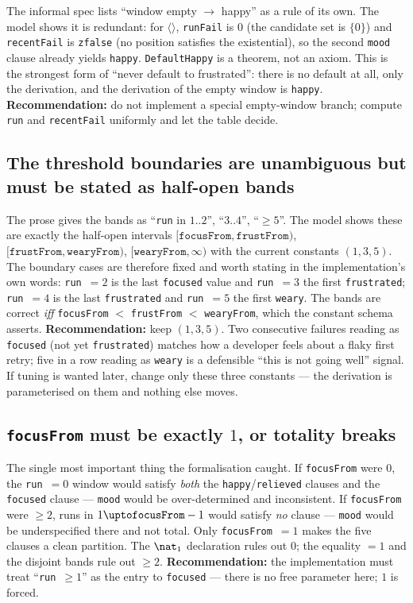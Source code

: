 \documentclass[a4paper,10pt,fleqn]{article}
\begin{document}
The informal spec lists ``window empty $\to$ happy'' as a rule of its own. The
model shows it is redundant: for $\langle\rangle$, \texttt{runFail} is $0$ (the
candidate set is $\{0\}$) and \texttt{recentFail} is \texttt{zfalse} (no position
satisfies the existential), so the second \texttt{mood} clause already yields
\texttt{happy}. \texttt{DefaultHappy} is a theorem, not an axiom. This is the
strongest form of ``never default to frustrated'': there is no default at all,
only the derivation, and the derivation of the empty window is \texttt{happy}.
\textbf{Recommendation:} do not implement a special empty-window branch; compute
\texttt{run} and \texttt{recentFail} uniformly and let the table decide.

\subsection{The threshold boundaries are unambiguous but must be stated as
half-open bands}
\label{find:bands}

The prose gives the bands as ``\texttt{run} in $1..2$'', ``$3..4$'', ``$\geq 5$''.
The model shows these are exactly the half-open intervals
$[\texttt{focusFrom}, \texttt{frustFrom})$, $[\texttt{frustFrom},
\texttt{wearyFrom})$, $[\texttt{wearyFrom}, \infty)$ with the current constants
$(1,3,5)$. The boundary cases are therefore fixed and worth stating in the
implementation's own words: \texttt{run}~$=2$ is the last \texttt{focused} value
and \texttt{run}~$=3$ the first \texttt{frustrated}; \texttt{run}~$=4$ is the last
\texttt{frustrated} and \texttt{run}~$=5$ the first \texttt{weary}. The bands are
correct \emph{iff} \texttt{focusFrom} $<$ \texttt{frustFrom} $<$
\texttt{wearyFrom}, which the constant schema asserts. \textbf{Recommendation:}
keep $(1,3,5)$. Two consecutive failures reading as \texttt{focused} (not yet
\texttt{frustrated}) matches how a developer feels about a flaky first retry; five
in a row reading as \texttt{weary} is a defensible ``this is not going well''
signal. If tuning is wanted later, change only these three constants --- the
derivation is parameterised on them and nothing else moves.

\subsection{\texttt{focusFrom} must be exactly $1$, or totality breaks}
\label{find:focusone}

The single most important thing the formalisation caught. If \texttt{focusFrom}
were $0$, the \texttt{run}~$=0$ window would satisfy \emph{both} the
\texttt{happy}/\texttt{relieved} clauses and the \texttt{focused} clause ---
\texttt{mood} would be over-determined and inconsistent. If \texttt{focusFrom}
were $\geq 2$, runs in $1 \upto \texttt{focusFrom} - 1$ would satisfy \emph{no}
clause --- \texttt{mood} would be underspecified there and not total. Only
\texttt{focusFrom}~$=1$ makes the five clauses a clean partition. The
\texttt{$\nat_1$} declaration rules out $0$; the equality $= 1$ and the disjoint
bands rule out $\geq 2$. \textbf{Recommendation:} the implementation must treat
``\texttt{run}~$\geq 1$'' as the entry to \texttt{focused} --- there is no free
parameter here; $1$ is forced.
\end{document}
